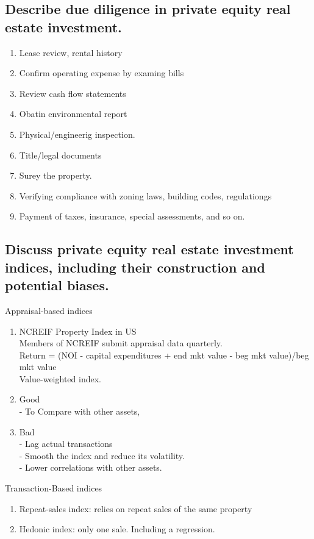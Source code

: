 \documentclass{article}
\newcommand{\be}{\begin{enumerate}}
\newcommand{\ee}{\end{enumerate}}
\begin{document}
\subsection{Describe due diligence in private equity real estate investment.}
\be
    \item Lease review, rental history
    \item Confirm operating expense by examing bills
    \item Review cash flow statements
    \item Obatin environmental report
    \item Physical/engineerig inspection.
    \item Title/legal documents
    \item Surey the property.
    \item Verifying compliance with zoning laws, building codes, regulationgs
    \item Payment of taxes, insurance, special assessments, and so on.
\ee

\subsection{Discuss private equity real estate investment indices, including their construction
and potential biases.}
Appraisal-based indices
\be
    \item NCREIF Property Index in US
        \\ Members of NCREIF submit appraisal data quarterly.
        \\ Return = (NOI - capital expenditures + end mkt value - beg mkt value)/beg mkt value
        \\ Value-weighted index.
    \item Good
        \\- To Compare with other assets, 
    \item Bad
        \\- Lag actual transactions
        \\- Smooth the index and reduce its volatility.
        \\- Lower correlations with other assets.
\ee
Transaction-Based indices
\be
    \item Repeat-sales index: relies on repeat sales of the same property
    \item Hedonic index: only one sale. Including a regression.
\ee
\end{document}
